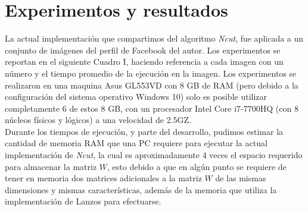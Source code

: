 \documentclass[conference]{IEEEtran}
\begin{document}
\section{Experimentos y resultados}
La actual implementación que compartimos del algoritmo \textit{Ncut}, fue aplicada a un conjunto de imágenes del perfil de Facebook del autor. Los experimentos se reportan en el siguiente Cuadro I, haciendo referencia a cada imagen con un número  y el tiempo promedio de la ejecución en la imagen. Los experimentos se realizaron en una maquina Asus GL553VD con 8 GB de RAM (pero debido a la configuración del sistema operativo Windows 10) solo es posible utilizar completamente 6 de estos 8 GB, con un procesador Intel Core i7-7700HQ (con 8 núcleos físicos y lógicos) a una velocidad de 2.5GZ.\\
Durante los tiempos de ejecución, y parte del desarrollo, pudimos estimar la cantidad de memoria RAM que una PC requiere para ejecutar la actual implementación de \textit{Ncut}, la cual es aproximadamente 4 veces el espacio requerido para almacenar la matriz $W$, esto debido a que en algún punto se requiere de tener en memoria dos matrices adicionales a la matriz $W$ de las mismas dimensiones y mismas características, además de la memoria que utiliza la implementación de Lanzos para efectuarse.
\end{document}

